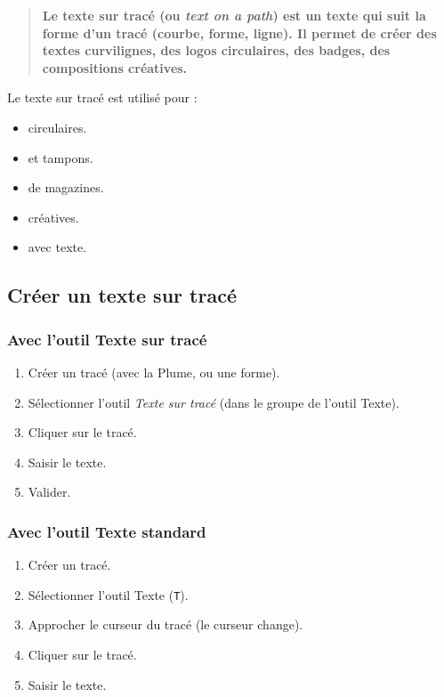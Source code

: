 \begin{quote}
\textbf{Le texte sur tracé (ou \emph{text on a path}) est un texte qui suit la forme d'un tracé (courbe, forme, ligne). Il permet de créer des textes curvilignes, des logos circulaires, des badges, des compositions créatives.}
\end{quote}

Le texte sur tracé est utilisé pour :

\begin{itemize}
    \item {} circulaires.
    \item {} et tampons.
    \item {} de magazines.
    \item {} créatives.
    \item {} avec texte.
\end{itemize}

\subsection{Créer un texte sur tracé}

\subsubsection{Avec l'outil Texte sur tracé}

\begin{enumerate}
    \item Créer un tracé (avec la Plume, ou une forme).
    \item Sélectionner l'outil \emph{Texte sur tracé} (dans le groupe de l'outil Texte).
    \item Cliquer sur le tracé.
    \item Saisir le texte.
    \item Valider.
\end{enumerate}

\subsubsection{Avec l'outil Texte standard}

\begin{enumerate}
    \item Créer un tracé.
    \item Sélectionner l'outil Texte (\texttt{T}).
    \item Approcher le curseur du tracé (le curseur change).
    \item Cliquer sur le tracé.
    \item Saisir le texte.
\end{enumerate}

